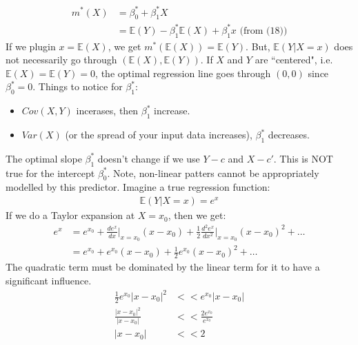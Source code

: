 \documentclass{article}
\newcommand{\E}{\mathbb{E}}
\begin{document}
\begin{align}
    m^*(X) &= \beta_0^* + \beta_1^*X\\
    &= \E(Y) - \beta_1^*\E(X) + \beta_1^*x \text{ (from (18))}
\end{align}
If we plugin $x = \E(X)$, we get $m^*(\E(X)) = \E(Y)$. But, $\E(Y| X=x)$ does not necessarily go through $(\E(X), \E(Y))$.
\bigbreak\noindent If $X$ and $Y$ are ``centered", i.e. $\E(X) = \E(Y) = 0$, the optimal regression line goes through $(0,0)$ since $\beta_0^* = 0$.
\bigbreak\noindent Things to notice for $\beta_1^*$:
\begin{itemize}
    \item $Cov(X,Y)$ incerases, then $\beta_1^*$ increase.
    \item $Var(X)$ (or the spread of your input data increases), $\beta_1^*$ decreases.
\end{itemize}
The optimal slope $\beta_1^*$ doesn't change if we use $Y-c$ and $X-c'$. This is NOT true for the intercept $\beta_0^*$.
\bigbreak\noindent Note, non-linear patters cannot be appropriately modelled by this predictor. Imagine a true regression function:
\begin{align}
    \E(Y|X = x) = e^x
\end{align}
If we do a Taylor expansion at $X = x_0$, then we get:
\begin{align}
    e^x &= e^{x_0} + \frac{de^x}{dx}\bigg|_{x=x_0}(x-x_0) + \frac{1}{2}\frac{d^2e^x}{dx^2}\bigg|_{x=x_0}(x-x_0)^2 + \ldots\\
    &= e^{x_0} + e^{x_0}(x-x_0) + \frac{1}{2} e^{x_0}(x-x_0)^2 + \ldots
\end{align}
The quadratic term must be dominated by the linear term for it to have a significant influence.
\begin{align}
    \frac{1}{2}e^{x_0}|x-x_0|^2 &<< e^{x_0}|x-x_0|\\
    \frac{|x-x_0|^2}{|x-x_0|} &<< \frac{2e^{x_0}}{e^{x_0}}\\
    |x-x_0| &<< 2
\end{align}
\end{document}
